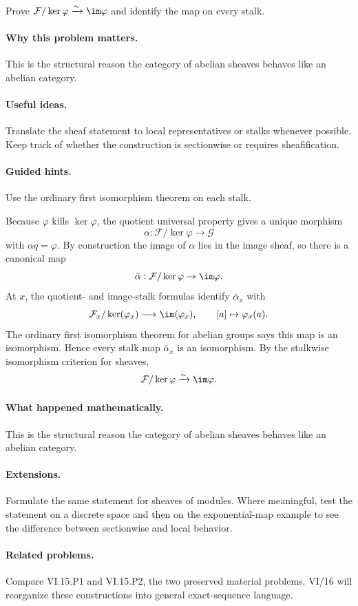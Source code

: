 \begin{problem}\label{prob:vi15-p9}
Prove $\mathcal F/\ker\varphi\xrightarrow{\sim}\im\varphi$ and identify the map on every stalk.
\end{problem}

\ifdefined\FullProblemDossiers
\paragraph{Why this problem matters.}
This is the structural reason the category of abelian sheaves behaves like an abelian category.

\paragraph{Useful ideas.}
Translate the sheaf statement to local representatives or stalks whenever possible.  Keep track of whether the construction is sectionwise or requires sheafification.

\paragraph{Guided hints.}
Use the ordinary first isomorphism theorem on each stalk.

\begin{solution}
Because $\varphi$ kills $\ker\varphi$, the quotient universal property gives a unique morphism
\[
\alpha:\mathcal F/\ker\varphi\to\mathcal G
\]
with $\alpha q=\varphi$. By construction the image of $\alpha$ lies in the image sheaf, so there is a canonical map
\[
\bar\alpha:\mathcal F/\ker\varphi\to\im\varphi.
\]
At $x$, the quotient- and image-stalk formulas identify $\bar\alpha_x$ with
\[
\mathcal F_x/\ker(\varphi_x)\longrightarrow\im(\varphi_x),\qquad [a]\mapsto\varphi_x(a).
\]
The ordinary first isomorphism theorem for abelian groups says this map is an isomorphism. Hence every stalk map $\bar\alpha_x$ is an isomorphism. By the stalkwise isomorphism criterion for sheaves,
\[
\mathcal F/\ker\varphi\xrightarrow{\sim}\im\varphi.
\]
\end{solution}

\paragraph{What happened mathematically.}
This is the structural reason the category of abelian sheaves behaves like an abelian category.

\paragraph{Extensions.}
Formulate the same statement for sheaves of modules.  Where meaningful, test the statement on a discrete space and then on the exponential-map example to see the difference between sectionwise and local behavior.

\paragraph{Related problems.}
Compare VI.15.P1 and VI.15.P2, the two preserved material problems.  VI/16 will reorganize these constructions into general exact-sequence language.
\fi
